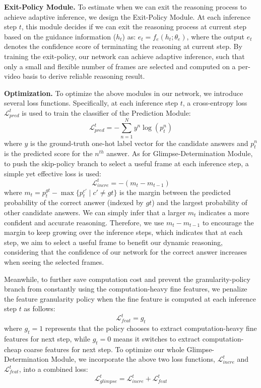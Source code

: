 \documentclass[final]{cvpr}
\begin{document}
{\bf Exit-Policy Module.} To estimate when we can exit the reasoning process to achieve adaptive inference, we design the Exit-Policy Module. At each inference step $t$, this module decides if we can exit the reasoning process at current step based on the guidance information ($h_t$) as: $e_{t}=f_{e}(h_{t};\theta_e)$, where the output $e_t$ denotes
the confidence score of terminating the reasoning at current step. By training the exit-policy, 
our network can achieve adaptive inference, such that only a small and flexible number of frames are selected and computed on a per-video basis to derive reliable reasoning result.

{\bf Optimization.} To optimize the above modules in our network, we introduce several loss functions. Specifically, at each inference step $t$, a cross-entropy loss $\mathcal{L}^t_{pred}$ is used to train the classifier of the Prediction Module:
\begin{equation}\label{eq.cross-entropy loss}
    \mathcal{L}^t_{pred}= -\sum_{n=1}^{N} y^n \log (p^{n}_{t})
\end{equation}
where $y$ is the ground-truth one-hot label vector for the candidate answers and $p^{n}_{t}$ is the predicted score for the $n^{th}$ answer.
As for Glimpse-Determination Module, to push the skip-policy branch to select a useful frame at each inference step, a simple yet effective loss is used:
\begin{equation}\label{eq.increment_loss}
    \mathcal{L}^t_{incre} = -(m_{t} - m_{t-1}) 
\end{equation}
where $m_{t}=p_{t}^{gt}-\max \{ p_{t}^{c'}\mid c'\neq gt \}$ is the margin between the predicted probability of the correct answer (indexed by $gt$) and the largest probability of other candidate answers. We can simply infer that a larger $m_t$ indicates a more confident and accurate reasoning. Therefore, we use $m_{t}-m_{t-1}$ to encourage the margin to keep growing over the inference steps, which indicates that at each step, we aim to select a useful frame to benefit our dynamic reasoning, considering that the confidence of our network for the correct answer increases when seeing the selected frames.


Meanwhile, to further save computation cost and prevent the granularity-policy branch from constantly using the computation-heavy fine features, we penalize the feature granularity policy
when the fine feature is computed at each inference step $t$ as follows:
\begin{equation}\label{eq.feature_loss}
    \mathcal{L}^t_{feat}= g_{t}
\end{equation}
where $g_t=1$ represents that the policy chooses to extract computation-heavy fine features for next step, while $g_t=0$ means it switches to extract computation-cheap coarse features for next step.
To optimize our whole Glimpse-Determination Module, we incorporate the above two loss functions,   $\mathcal{L}^t_{incre}$ and $\mathcal{L}^t_{feat}$, into a combined loss:
\begin{equation}\label{eq.glimpse_loss}
    \mathcal{L}^t_{glimpse}= \mathcal{L}^t_{incre} + \mathcal{L}^t_{feat}
\end{equation}
\end{document}
